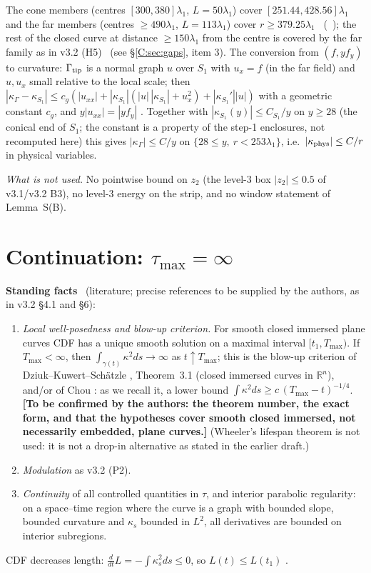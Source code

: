 \documentclass[11pt]{article}
\begin{document}
The cone members (centres $[300,380]\lambda_1$, $L=50\lambda_1$) cover $[251.44,428.56]\lambda_1$ and the far members (centres $\ge490\lambda_1$, $L=113\lambda_1$) cover $r\ge379.25\lambda_1$ \tC\ (\SZ\ ); the rest of the closed curve at distance $\ge150\lambda_1$ from the centre is covered by the far family as in v3.2 (H5) \tH\ (see \S\ref{C:sec:gaps}, item 3). The conversion from $(f,yf_y)$ to curvature: $\Gamma_{\rm tip}$ is a normal graph $u$ over $S_1$ with $u_x=f$ (in the far field) and $u,u_x$ small relative to the local scale; then $|\kappa_\Gamma-\kappa_{S_1}|\le c_g(|u_{xx}|+|\kappa_{S_1}|(|u|\,|\kappa_{S_1}|+u_x^2)+|\kappa_{S_1}'||u|)$ with a geometric constant $c_g$, and $y|u_{xx}|=|yf_y|$ \tP. Together with $|\kappa_{S_1}(y)|\le C_{S_1}/y$ on $y\ge28$ (the conical end of $S_1$; the constant is a property of the step-1 enclosures, not recomputed here) this gives $|\kappa_\Gamma|\le C/y$ on $\{28\le y,\ r<253\lambda_1\}$, i.e.\ $|\kappa_{\rm phys}|\le C/r$ in physical variables.

\noindent\emph{What is not used.} No pointwise bound on $z_2$ (the level-3 box $|z_2|\le0.5$ of v3.1/v3.2 B3), no level-3 energy on the strip, and no window statement of Lemma~S(B).

\section{Continuation: $\tau_{\max}=\infty$}\label{C:sec:cont}
\noindent\textbf{Standing facts} \tH\ (literature; precise references to be supplied by the authors, as in v3.2 \S4.1 and \S6):
\begin{enumerate}[label=(P\arabic*$'$),leftmargin=3em]
\item \emph{Local well-posedness and blow-up criterion.} For smooth closed immersed plane curves CDF has a unique smooth solution on a maximal interval $[t_1,T_{\max})$. If $T_{\max}<\infty$, then $\int_{\gamma(t)}\kappa^2ds\to\infty$ as $t\uparrow T_{\max}$; this is the blow-up criterion of Dziuk--Kuwert--Sch\"atzle \cite{DKS2002}, Theorem~3.1 (closed immersed curves in $\mathbb R^n$), and/or of Chou \cite{Chou2003}: as we recall it, a lower bound $\int\kappa^2ds\ge c\,(T_{\max}-t)^{-1/4}$. \textbf{[To be confirmed by the authors: the theorem number, the exact form, and that the hypotheses cover smooth closed immersed, not necessarily embedded, plane curves.]} (Wheeler's lifespan theorem is not used: it is not a drop-in alternative as stated in the earlier draft.)
\item \emph{Modulation} as v3.2 (P2).
\item \emph{Continuity} of all controlled quantities in $\tau$, and interior parabolic regularity: on a space--time region where the curve is a graph with bounded slope, bounded curvature and $\kappa_s$ bounded in $L^2$, all derivatives are bounded on interior subregions.
\end{enumerate}
CDF decreases length: $\frac{d}{dt}L=-\int\kappa_s^2ds\le0$, so $L(t)\le L(t_1)$ \tP.
\end{document}
